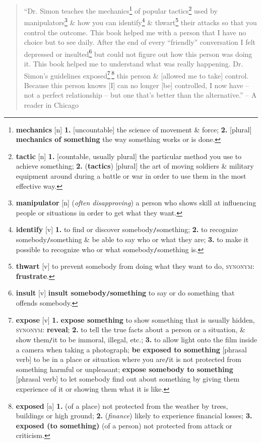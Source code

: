 \documentclass[oneside]{book}
\numberwithin{equation}{section}
\begin{document}
\begin{quotation}
	``Dr. Simon teaches the mechanics\footnote{\textbf{mechanics} [n] \textbf{1.} [uncountable] the science of  movement \& force; \textbf{2.} [plural] \textbf{mechanics of something} the way something works or is done.} of popular tactics\footnote{\textbf{tactic} [n] \textbf{1.} [countable, usually plural] the particular method you use to achieve something; \textbf{2.} (\textbf{tactics}) [plural] the art of moving soldiers \& military equipment around during a battle or war in order to use them in the most effective way.} used by manipulators\footnote{\textbf{manipulator} [n] (\textit{often disapproving}) a person who shows skill at influencing people or situations in order to get what they want.} \& how you can identify\footnote{\textbf{identify} [v] \textbf{1.} to find or discover somebody\texttt{/}something; \textbf{2.} to recognize somebody\texttt{/}something \& be able to say who or what they are; \textbf{3.} to make it possible to recognize who or what somebody\texttt{/}something is.} \& thwart\footnote{\textbf{thwart} [v] to prevent somebody from doing what they want to do, \textsc{synonym}: \textbf{frustrate}.} their attacks so that you control the outcome. This book helped me with a person that I have no choice but to see daily. After the end of every ``friendly'' conversation I felt depressed or insulted\footnote{\textbf{insult} [v] \textbf{insult somebody\texttt{/}something} to say or do something that offends somebody.} but could not figure out how this person was doing it. This book helped me to understand what was really happening. Dr. Simon's guidelines exposed\footnote{\textbf{expose} [v] \textbf{1.} \textbf{expose something} to show something that is usually hidden, \textsc{synonym}: \textbf{reveal}; \textbf{2.} to tell the true facts about a person or a situation, \& show them\texttt{/}it to be immoral, illegal, etc.; \textbf{3.} to allow light onto the film inside a camera when taking a photograph; \textbf{be exposed to something} [phrasal verb] to be in a place or situation where you are\texttt{/}it is not protected from something harmful or unpleasant; \textbf{expose somebody to something} [phrasal verb] to let somebody find out about something by giving them experience of it or showing them what it is like.}\,\footnote{\textbf{exposed} [a] \textbf{1.} (of a place) not protected from the weather by trees, buildings or high ground; \textbf{2.} (\textit{finance}) likely to experience financial losses; \textbf{3.} \textbf{exposed (to something)} (of a  person) not protected from attack or criticism.} this person \& [allowed me to take] control. Because this person knows [I] can no longer [be] controlled, I now have -- not a perfect relationship -- but one that's better than the alternative.'' -- A reader in Chicago\\
	

\end{quotation}
\end{document}
